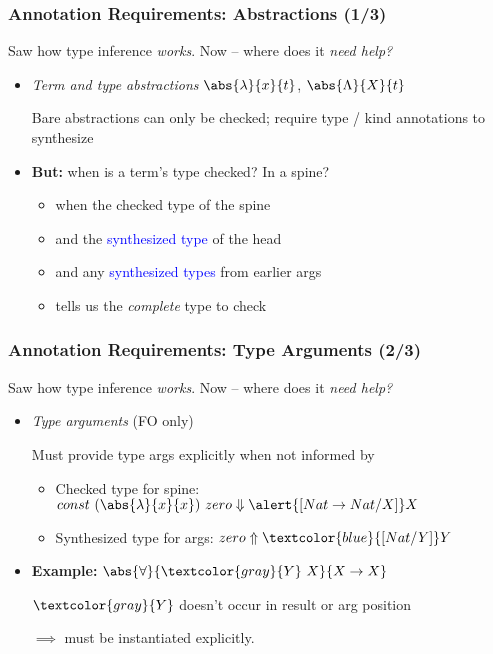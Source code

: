 \documentclass{beamer}
\begin{document}
\begin{frame}
  \frametitle{Annotation Requirements: Abstractions (1/3)}

  Saw how type inference \textit{works}. Now -- where does it
  \textit{need help?}
  
  \begin{itemize}
  \item<2-> \textit{Term and type abstractions} $\abs{\lambda}{x}{t}$, $\abs{\Lambda}{X}{t}$

    Bare abstractions can only be checked; require type / kind annotations to
    synthesize
  \item<3-> \textbf{But:} when is a term's type checked? In a spine?
    \begin{itemize}
    \item<5-> when the \alert{checked type} of the spine
    \item<6-> and the \textcolor{blue}{synthesized type} of the head
    \item<7-> and any \textcolor{blue}{synthesized types} from earlier args
    \item<8-> tells us the \textit{complete} type to \alert{check}
    \end{itemize}
  \end{itemize}

\end{frame}

\begin{frame}
  \frametitle{Annotation Requirements: Type Arguments (2/3)}

  Saw how type inference \textit{works}. Now -- where does it
  \textit{need help?}

  \begin{itemize}
  \item \textit{Type arguments} (FO only)

    Must provide type args explicitly when not informed by
    \begin{itemize}
    \item<2-> Checked type for spine: $const\ (\abs{\lambda}{x}{x})\ zero
      \Downarrow \alert{[Nat \to Nat/X]}X$
    \item<3-> Synthesized type for args: $zero \Uparrow \textcolor{blue}{[Nat/Y]}Y$
    \end{itemize}
  \item<4> \textbf{Example:} $\abs{\forall}{\textcolor{gray}{Y}\ X}{X \to X}$

    $\textcolor{gray}{Y}$ doesn't occur in result or arg position

    $\implies$ must be instantiated explicitly.
  \end{itemize}
\end{frame}
\end{document}
